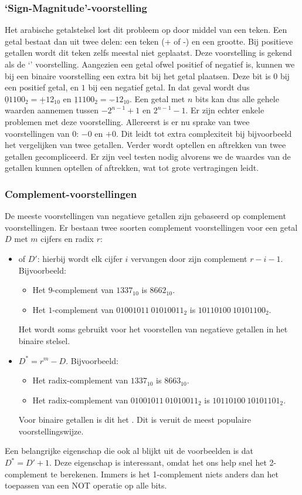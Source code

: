 \subsubsection{`Sign-Magnitude'-voorstelling}
Het arabische getalstelsel lost dit probleem op door middel van een teken. Een getal bestaat dan uit twee delen: een teken (+ of -) en een grootte. Bij positieve getallen wordt dit teken zelfs meestal niet geplaatst. Deze voorstelling is gekend als de `' voorstelling. Aangezien een getal ofwel positief of negatief is, kunnen we bij een binaire voorstelling een extra bit bij het getal plaatsen. Deze bit is $0$ bij een positief getal, en $1$ bij een negatief getal. In dat geval wordt dus $\underline{0}1100_2=\underline{+}12_{10}$ en $\underline{1}1100_2=\underline{-}12_{10}$. Een getal met $n$ bits kan dus alle gehele waarden aannemen tussen $-2^{n-1}+1$ en $2^{n-1}-1$. Er zijn echter enkele problemen met deze voorstelling. Allereerst is er nu sprake van twee voorstellingen van $0$: $-0$ en $+0$. Dit leidt tot extra complexiteit bij bijvoorbeeld het vergelijken van twee getallen. Verder wordt optellen en aftrekken van twee getallen gecompliceerd. Er zijn veel testen nodig alvorens we de waardes van de getallen kunnen optellen of aftrekken, wat tot grote vertragingen leidt.
\subsubsection{Complement-voorstellingen}
De meeste voorstellingen van negatieve getallen zijn gebaseerd op complement voorstellingen. Er bestaan twee soorten complement voorstellingen voor een getal $D$ met $m$ cijfers en radix $r$:
\begin{itemize}
 \item {} of  $D'$: hierbij wordt elk cijfer $i$ vervangen door zijn complement $r-i-1$. Bijvoorbeeld:
 \begin{itemize}
    \item Het $9$-complement van $1337_{10}$ is $8662_{10}$.
    \item Het $1$-complement van $01001011\ 01010011_2$ is $10110100\ 10101100_2$.
 \end{itemize}
 Het  wordt soms gebruikt voor het voorstellen van negatieve getallen in het binaire stelsel.
 \item {} $D^*=r^m-D$. Bijvoorbeeld:
 \begin{itemize}
    \item Het radix-complement van $1337_{10}$ is $8663_{10}$.
    \item Het radix-complement van $01001011\ 01010011_2$ is $10110100\ 10101101_2$.
 \end{itemize}
 Voor binaire getallen is dit het . Dit is veruit de meest populaire voorstellingswijze.
\end{itemize}
Een belangrijke eigenschap die ook al blijkt uit de voorbeelden is dat $D^*=D'+1$. Deze eigenschap is interessant, omdat het ons help snel het 2-complement te berekenen. Immers is het 1-complement niets anders dan het toepassen van een NOT operatie op alle bits.
